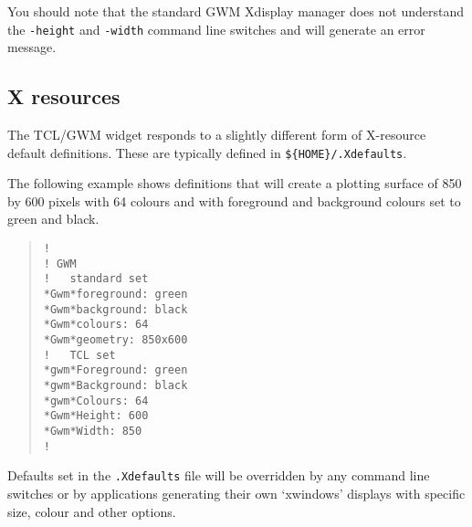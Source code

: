 You should note that the standard GWM Xdisplay manager does not understand the
{\tt{-height}} and {\tt{-width}} command line switches and will generate an
error message.

\subsection{\label{x_resources}X resources}

The TCL/GWM widget responds to a slightly different form of X-resource
default definitions.  These are typically defined in
{\verb+${HOME}/.Xdefaults+}.

The following example shows definitions that will create a plotting
surface of 850 by 600 pixels with 64 colours and with foreground and
background colours set to green and black.

\begin{quote}
\begin{verbatim}
!
! GWM
!   standard set
*Gwm*foreground: green
*Gwm*background: black
*Gwm*colours: 64
*Gwm*geometry: 850x600
!   TCL set
*gwm*Foreground: green
*gwm*Background: black
*gwm*Colours: 64
*Gwm*Height: 600
*Gwm*Width: 850
!
\end{verbatim}
\end{quote}

Defaults set in the {\tt{.Xdefaults}} file will be overridden by any
command line switches or by applications generating their own `xwindows'
displays with specific size, colour and other options.


